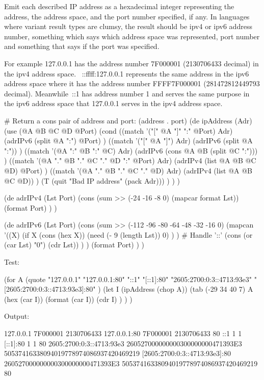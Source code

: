 Emit each described IP address as a hexadecimal integer representing the
address, the address space, and the port number specified, if any. In
languages where variant result types are clumsy, the result should be
ipv4 or ipv6 address number, something which says which address space
was represented, port number and something that says if the port was
specified.

For example 127.0.0.1 has the address number 7F000001 (2130706433
decimal) in the ipv4 address space. ~::ffff:127.0.0.1 represents the
same address in the ipv6 address space where it has the address number
FFFF7F000001 (281472812449793 decimal). Meanwhile~::1 has address number
1 and serves the same purpose in the ipv6 address space that 127.0.0.1
serves in the ipv4 address space.

\begin{wideverbatim}

# Return a cons pair of address and port: (address . port)
(de ipAddress (Adr)
   (use (@A @B @C @D @Port)
      (cond
         ((match '("[" @A "]" ":" @Port) Adr)
            (adrIPv6 (split @A ":") @Port) )
         ((match '("[" @A "]") Adr)
            (adrIPv6 (split @A ":")) )
         ((match '(@A ":" @B ":" @C) Adr)
            (adrIPv6 (cons @A @B (split @C ":"))) )
         ((match '(@A "." @B "." @C "." @D ":" @Port) Adr)
            (adrIPv4 (list @A @B @C @D) @Port) )
         ((match '(@A "." @B "." @C "." @D) Adr)
            (adrIPv4 (list @A @B @C @D)) )
         (T (quit "Bad IP address" (pack Adr))) ) ) )

(de adrIPv4 (Lst Port)
   (cons
      (sum >> (-24 -16 -8 0) (mapcar format Lst))
      (format Port) ) )

(de adrIPv6 (Lst Port)
   (cons
      (sum >>
         (-112 -96 -80 -64 -48 -32 -16 0)
         (mapcan
            '((X)
               (if X
                  (cons (hex X))
                  (need (- 9 (length Lst)) 0) ) )  # Handle '::'
            (cons (or (car Lst) "0") (cdr Lst)) ) )
      (format Port) ) )

\end{wideverbatim}

\begin{wideverbatim}

Test:

(for A
   (quote
      "127.0.0.1"
      "127.0.0.1:80"
      "::1"
      "[::1]:80"
      "2605:2700:0:3::4713:93e3"
      "[2605:2700:0:3::4713:93e3]:80" )
   (let I (ipAddress (chop A))
      (tab (-29 34 40 7)
         A
         (hex (car I))
         (format (car I))
         (cdr I) ) ) )

Output:

127.0.0.1        7F000001   2130706433
127.0.0.1:80     7F000001   2130706433     80
::1              1          1
[::1]:80         1          1              80
2605:2700:0:3::4713:93e3       260527000000000300000000471393E3  
50537416338094019778974086937420469219
[2605:2700:0:3::4713:93e3]:80  260527000000000300000000471393E3  
50537416338094019778974086937420469219     80

\end{wideverbatim}


